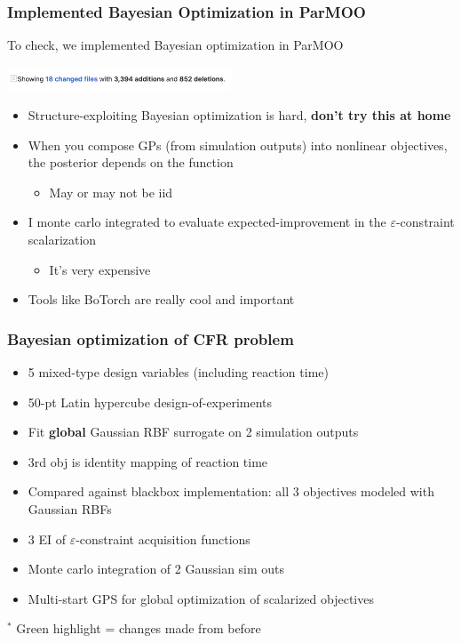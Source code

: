 \documentclass[aspectratio=169]{beamer}
\begin{document}
\begin{frame}\frametitle{Implemented Bayesian Optimization in ParMOO}

To check, we implemented Bayesian optimization in ParMOO

\bigskip
\begin{center}
\pause\includegraphics[width=0.5\textwidth]{../img/moo_new/bo-pr.png}
\end{center}

\begin{itemize}
\item Structure-exploiting Bayesian optimization is hard, {\bf don't try this at home}
\item When you compose GPs (from simulation outputs) into nonlinear objectives, the posterior depends on the function
\begin{itemize}
\item May or may not be iid
\end{itemize}
\item I monte carlo integrated to evaluate expected-improvement in the $\varepsilon$-constraint scalarization
\begin{itemize}
\item It's very expensive
\end{itemize}
\item Tools like BoTorch are really cool and important
\end{itemize}
\end{frame}

\begin{frame}\frametitle{Bayesian optimization of CFR problem}
\begin{itemize}
\item 5 mixed-type design variables (including reaction time)
\item 50-pt Latin hypercube design-of-experiments
\item Fit {\bf global} Gaussian RBF surrogate on 2 simulation outputs
\item {\color{blue}3rd obj is identity mapping of reaction time}
\item {\color{red}Compared against blackbox implementation: all 3 objectives
modeled with Gaussian RBFs}
\item {\color{green}3 EI of $\varepsilon$-constraint acquisition functions}
\item {\color{green}Monte carlo integration of 2 Gaussian sim outs}
\item {\color{green}Multi-start GPS for global optimization of scalarized objectives}
\end{itemize}

\bigskip

$^*${\color{green} Green highlight} = changes made from before
\end{frame}
\end{document}
